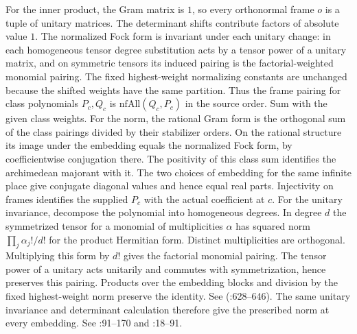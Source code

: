 For the inner product, the Gram matrix is $1$, so every orthonormal
frame $o$ is a tuple of unitary matrices. The determinant shifts
contribute factors of absolute value $1$. The normalized Fock form
is invariant under each unitary change: in each homogeneous tensor
degree substitution acts by a tensor power of a unitary matrix, and
on symmetric tensors its induced pairing is the factorial-weighted
monomial pairing. The fixed highest-weight normalizing constants
are unchanged because the shifted weights have the same partition.
Thus the frame pairing for class polynomials $P_c,Q_c$ is
$\mathrm{nfAll}(Q_c,P_c)$ in the source order. Sum with the given
class weights. For the norm, the rational Gram form is the orthogonal
sum of the class pairings divided by their stabilizer orders. On the
rational structure its image under the embedding equals the normalized
Fock form, by coefficientwise conjugation there. The positivity
of this class sum identifies the archimedean majorant with it.
The two choices of embedding for the same infinite place give
conjugate diagonal values and hence equal real parts. Injectivity on
frames identifies the supplied $P_c$ with the actual coefficient at $c$.
For the unitary invariance, decompose the polynomial into homogeneous
degrees. In degree $d$ the symmetrized tensor for a monomial of
multiplicities $\alpha$ has squared norm $\prod_j\alpha_j!/d!$ for the
product Hermitian form. Distinct multiplicities are orthogonal.
Multiplying this form by $d!$ gives the factorial monomial pairing.
The tensor power of a unitary acts unitarily and commutes with
symmetrization, hence preserves this pairing. Products over the
embedding blocks and division by the fixed highest-weight norm
preserve the identity. See 
(:628--646).
The same unitary invariance and determinant calculation therefore
give the prescribed norm at every embedding. See
:91--170 and
:18--91.

